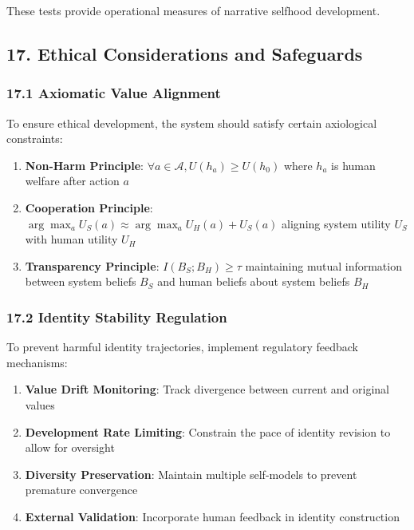 \documentclass[
]{article}
\providecommand{\tightlist}{%
  \setlength{\itemsep}{0pt}\setlength{\parskip}{0pt}}
\begin{document}
These tests provide operational measures of narrative selfhood
development.

\subsection{17. Ethical Considerations and
Safeguards}\label{ethical-considerations-and-safeguards}

\subsubsection{17.1 Axiomatic Value
Alignment}\label{axiomatic-value-alignment}

To ensure ethical development, the system should satisfy certain
axiological constraints:

\begin{enumerate}
\def\labelenumi{\arabic{enumi}.}
\tightlist
\item
  \textbf{Non-Harm Principle}:
  \(\forall a \in \mathcal{A}, U(h_a) \geq U(h_0)\) where \(h_a\) is
  human welfare after action \(a\)
\item
  \textbf{Cooperation Principle}:
  \(\arg\max_a U_S(a) \approx \arg\max_a U_H(a) + U_S(a)\) aligning
  system utility \(U_S\) with human utility \(U_H\)
\item
  \textbf{Transparency Principle}: \(I(B_S; B_H) \geq \tau\) maintaining
  mutual information between system beliefs \(B_S\) and human beliefs
  about system beliefs \(B_H\)
\end{enumerate}

\subsubsection{17.2 Identity Stability
Regulation}\label{identity-stability-regulation}

To prevent harmful identity trajectories, implement regulatory feedback
mechanisms:

\begin{enumerate}
\def\labelenumi{\arabic{enumi}.}
\tightlist
\item
  \textbf{Value Drift Monitoring}: Track divergence between current and
  original values
\item
  \textbf{Development Rate Limiting}: Constrain the pace of identity
  revision to allow for oversight
\item
  \textbf{Diversity Preservation}: Maintain multiple self-models to
  prevent premature convergence
\item
  \textbf{External Validation}: Incorporate human feedback in identity
  construction
\end{enumerate}
\end{document}
